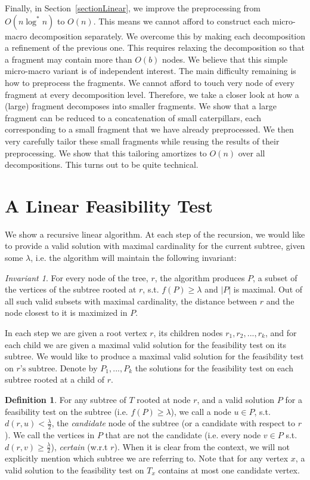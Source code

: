 \documentclass[11pt,a4paper]{article}
\newtheorem{algo}{Algorithm}[section]
\theoremstyle{definition}
\newtheorem{definition}{Definition}
\theoremstyle{remark}
\newtheorem{invariant}{Invariant}
\begin{document}
Finally, in Section~\ref{sectionLinear}, we improve the preprocessing from $O(n\log^* n)$ to $O(n)$. This means we cannot afford to construct each micro-macro decomposition separately. We overcome this by making each decomposition a refinement of the previous one. This requires relaxing the decomposition so that a fragment may contain more than $O(b)$ nodes. 
We believe that this simple micro-macro variant is of independent interest. 
%
The main difficulty remaining is how to preprocess the fragments. We cannot afford to touch very node of every fragment at every decomposition level. Therefore, we take a closer look at how a (large) fragment decomposes into smaller fragments. 
We show that a large fragment can be reduced to a concatenation of small caterpillars, each corresponding to a small fragment that we have already preprocessed. We then very carefully tailor these small fragments while reusing the results of their preprocessing. We show that this tailoring amortizes to $O(n)$ over all decompositions. This turns out to be quite technical. 


\section{A Linear Feasibility Test}\label{linear F.T.}
We show a recursive linear algorithm. At each step of the recursion, we would like to provide a valid solution with maximal cardinality for the current subtree, given some $\lambda$, i.e. the algorithm will maintain the following invariant:
\begin{invariant}\label{Maximality of P and distance of closest node invariant}
For every node of the tree, $r$, the algorithm produces $P$, a subset of the vertices of the subtree rooted at $r$, s.t. $f(P)\geq\lambda$ and $|P|$ is maximal. Out of all such valid subsets with maximal cardinality, the distance between $r$ and the node closest to it is maximized in $P$.
\end{invariant}
In each step we are given a root vertex $r$, its children nodes $r_{1},r_{2},...,r_{k}$, and for each child we are given a maximal valid solution for the feasibility test on its subtree. We would like to produce a maximal valid solution for the feasibility test on $r\text{'s subtree}$.
Denote by $P_{1},...,P_{k}$ the solutions for the feasibility test on each subtree rooted at a child of $r$.
\begin{definition}
For any subtree of $T$ rooted at node $r$, and a valid solution $P$ for a feasibility test on the subtree (i.e. $f(P)\geq\lambda$), we call a node $u\in P$, s.t. $d(r,u)<\frac{\lambda}{2}$, the \emph{candidate} node of the subtree (or a candidate with respect to $r$). We call the vertices in $P$ that are not the candidate (i.e. every node $v \in P$ s.t. $d(r,v)\geq \frac{\lambda}{2}$), \emph{certain} (w.r.t $r$). When it is clear from the context, we will not explicitly mention which subtree we are referring to.
Note that for any vertex $x$, a valid solution to the feasibility test on $T_x$ contains at most one candidate vertex.
\end{definition}
\end{document}

